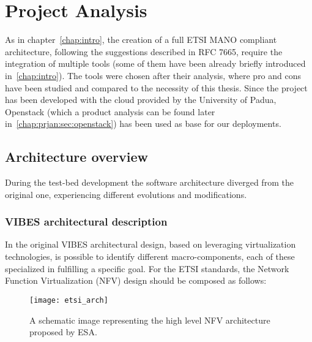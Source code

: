 \chapter{Project Analysis}
\label{chap:prjan}

As in chapter~\ref{chap:intro}, the creation of a full ETSI MANO compliant
architecture, following the suggestions described in RFC 7665, require the
integration of multiple tools (some of them have been already briefly introduced
in~\ref{chap:intro}). The tools were chosen after their analysis, where pro and
cons have been studied and compared to the necessity of this thesis. Since the
project has been developed with the cloud provided by the University of Padua,
Openstack (which a product analysis can be found later
in~\ref{chap:prjan:sec:openstack}) has been used as base for our deployments.

\section{Architecture overview}

During the test-bed development the software architecture diverged from the
original one, experiencing different evolutions and modifications.

\subsection{VIBES architectural description}

In the original VIBES architectural design, based on leveraging virtualization
technologies, is possible to identify different macro-components, each of these
specialized in fulfilling a specific goal. For the ETSI standards, the Network
Function Virtualization (NFV) design should be composed as follows:
\begin{figure}[t]
 \centering \texttt{[image: etsi\_arch]}
 \caption{A schematic image representing the high level NFV architecture
   proposed by ESA.}
 \label{chap:prjan:img:etsi_arch}
\end{figure}

